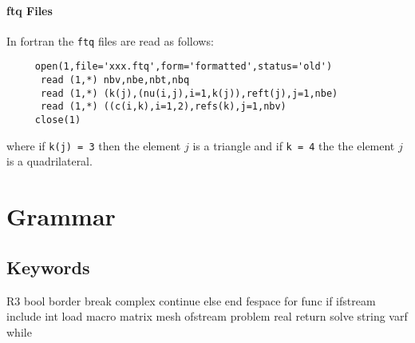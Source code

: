 \documentclass[twoside]{book}
\begin{document}
\paragraph{ftq Files}\label{FTQ}
In fortran the  {\tt ftq}  files are read as follows:
\begin{verbatim}
     open(1,file='xxx.ftq',form='formatted',status='old')
      read (1,*) nbv,nbe,nbt,nbq
      read (1,*) (k(j),(nu(i,j),i=1,k(j)),reft(j),j=1,nbe)
      read (1,*) ((c(i,k),i=1,2),refs(k),j=1,nbv)
     close(1)
\end{verbatim}
where   if {\tt  k(j) = 3} then the element $j$  is  a triangle and if {\tt k = 4}
the the element $j$   is a quadrilateral.



\section{Grammar}
\subsection{Keywords}
\bFF
      R3  
      bool 
      border 
      break 
      complex 
      continue 
      else
      end 
      fespace
      for 
      func 
      if 
      ifstream 
      include 
      int 
      load      
      macro
      matrix
      mesh 
      ofstream
      problem
      real
      return
      solve
      string 
      varf 
      while

\eFF
\end{document}
